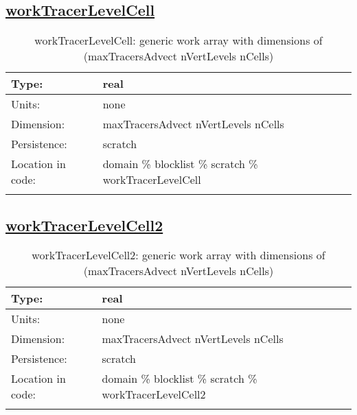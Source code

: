 \subsection[workTracerLevelCell]{\hyperref[sec:var_tab_scratch]{workTracerLevelCell}}
\label{subsec:var_sec_scratch_workTracerLevelCell}
\begin{center}
\begin{longtable}{| p{2.0in} | p{4.0in} |}
        \hline 
        Type: & real \\
        \hline 
        Units: & \si{none} \\
        \hline 
        Dimension: & maxTracersAdvect nVertLevels nCells \\
        \hline 
        Persistence: & scratch \\
        \hline 
         Location in code: & domain \% blocklist \% scratch \% workTracerLevelCell \\
         \hline 
    \caption{workTracerLevelCell: generic work array with dimensions of (maxTracersAdvect nVertLevels nCells)}
\end{longtable}
\end{center}
\subsection[workTracerLevelCell2]{\hyperref[sec:var_tab_scratch]{workTracerLevelCell2}}
\label{subsec:var_sec_scratch_workTracerLevelCell2}
\begin{center}
\begin{longtable}{| p{2.0in} | p{4.0in} |}
        \hline 
        Type: & real \\
        \hline 
        Units: & \si{none} \\
        \hline 
        Dimension: & maxTracersAdvect nVertLevels nCells \\
        \hline 
        Persistence: & scratch \\
        \hline 
         Location in code: & domain \% blocklist \% scratch \% workTracerLevelCell2 \\
         \hline 
    \caption{workTracerLevelCell2: generic work array with dimensions of (maxTracersAdvect nVertLevels nCells)}
\end{longtable}
\end{center}
